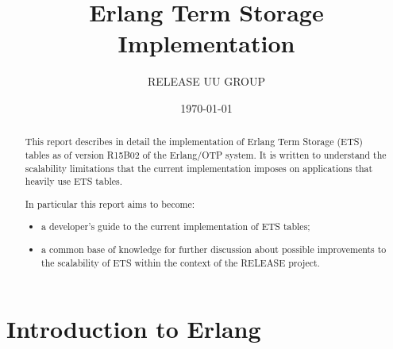 \documentclass[aps,pre,preprint,nofootinbib]{revtex4}
\begin{document}
\title{Erlang Term Storage Implementation}
\author{RELEASE UU GROUP}
\date{\today}


\begin{abstract}

This report describes in detail the implementation of Erlang Term Storage (ETS) tables as of version R15B02 of the Erlang/OTP system.
It is written to understand the scalability limitations that the current implementation imposes on applications that heavily use ETS tables.

In particular this report aims to become:
\begin{itemize} 
\item a developer's guide to the current implementation of ETS tables;
\item a common base of knowledge for further discussion about possible improvements to the scalability of ETS within the context of the RELEASE project.
\end{itemize}

\end{abstract}

\maketitle

\section{Introduction to Erlang}\label{sec:erlang_intro}
\end{document}
